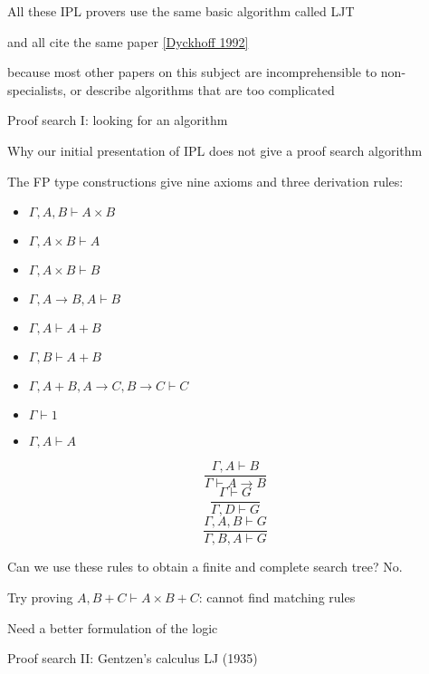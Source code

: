 All these IPL provers use the same basic algorithm called LJT 

and all cite the same paper {\footnotesize{}\href{https://rd.host.cs.st-andrews.ac.uk/publications/jsl57.pdf}{[Dyckhoff 1992]}}{\footnotesize\par}

because most other papers on this subject are incomprehensible to
non-specialists, or describe algorithms that are too complicated

Proof search I: looking for an algorithm

Why our initial presentation of IPL does not give a proof search algorithm

The FP type constructions give nine axioms and three derivation rules:

\begin{minipage}[t]{0.49\columnwidth}%
\begin{itemize}
\item $\Gamma,A,B\vdash A\times B$ 
\item $\Gamma,A\times B\vdash A$ 
\item $\Gamma,A\times B\vdash B$
\item $\Gamma,A\rightarrow B,A\vdash B$
\item $\Gamma,A\vdash A+B$ 
\item $\Gamma,B\vdash A+B$
\item $\Gamma,A+B,A\rightarrow C,B\rightarrow C\vdash C$
\item $\Gamma\vdash1$
\item $\Gamma,A\vdash A$
\end{itemize}
%
\end{minipage}%
\begin{minipage}[t]{0.49\columnwidth}%
\[
\frac{\Gamma,A\vdash B}{\Gamma\vdash A\rightarrow B}
\]
\[
\frac{\Gamma\vdash G}{\Gamma,D\vdash G}
\]
\[
\frac{\Gamma,A,B\vdash G}{\Gamma,B,A\vdash G}
\]
%
\end{minipage}

\medskip{}
Can we use these rules to obtain a finite and complete search tree?
No.

Try proving $A,B+C\vdash A\times B+C$: cannot find matching rules

Need a better formulation of the logic

Proof search II: Gentzen's calculus LJ (1935)

